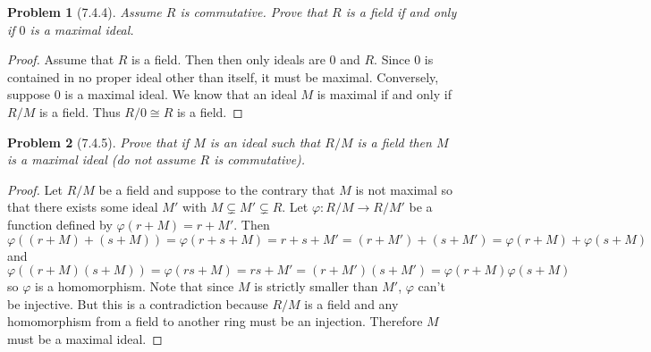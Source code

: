 \documentclass{article}
\newtheorem{problem}{Problem}
\begin{document}

\begin{problem}[7.4.4]
Assume $R$ is commutative. Prove that $R$ is a field if and only if $0$ is a maximal ideal.
\end{problem}
\begin{proof}
Assume that $R$ is a field. Then then only ideals are $0$ and $R$. Since $0$ is contained in no proper ideal other than itself, it must be maximal. Conversely, suppose $0$ is a maximal ideal. We know that an ideal $M$ is maximal if and only if $R/M$ is a field. Thus $R/0 \cong R$ is a field.
\end{proof}

\begin{problem}[7.4.5]
Prove that if $M$ is an ideal such that $R/M$ is a field then $M$ is a maximal ideal (do not assume $R$ is commutative).
\end{problem}
\begin{proof}
Let $R/M$ be a field and suppose to the contrary that $M$ is not maximal so that there exists some ideal $M'$ with $M \subsetneq M' \subsetneq R$. Let $\varphi : R/M \to R/M'$ be a function defined by $\varphi(r + M) = r + M'$. Then
\[
\varphi((r + M)+(s + M)) = \varphi(r+s+M) = r+s+M' = (r + M') + (s + M') = \varphi(r + M) + \varphi(s + M)
\]
and
\[
\varphi((r + M)(s + M)) = \varphi(rs + M) = rs + M' = (r + M')(s + M') = \varphi(r + M)\varphi(s + M)
\]
so $\varphi$ is a homomorphism. Note that since $M$ is strictly smaller than $M'$, $\varphi$ can't be injective. But this is a contradiction because $R/M$ is a field and any homomorphism from a field to another ring must be an injection. Therefore $M$ must be a maximal ideal.
\end{proof}
\end{document}

